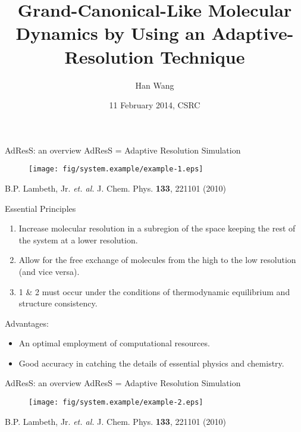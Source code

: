\documentclass[]{beamer}
\newcommand{\redc}[1]{{\color{red} #1}}
\newcommand{\bluec}[1]{{\color{blue} #1}}
\newcommand{\whitec}[1]{{\color{white} #1}}
\begin{document}
\title[Grand-Canonical MD by AdResS]{
  Grand-Canonical-Like Molecular Dynamics  by Using an
  Adaptive-Resolution Technique
}
%
\author{Han Wang}
\date[Feb. 2014]{11 February 2014, CSRC}
\frame{\titlepage}

\begin{frame}{AdResS: an overview}
  \redc{AdResS} = \redc{Ad}aptive \redc{Res}olution \redc{S}imulation
  \begin{figure}
    \centering 
    \texttt{[image: fig/system.example/example-1.eps]}
  \end{figure}
  \footnotesize{B.P. Lambeth, Jr. \textit{et. al.} J. Chem. Phys. \textbf{133}, 221101 (2010)}
\end{frame}

\begin{frame}{Essential Principles}
  \vfill  
  \begin{enumerate}
  \item  \redc{Increase molecular resolution} in a subregion of the space
    keeping the rest of the system at a lower resolution.
  \item  Allow for the \redc{free exchange} of molecules from the
    high to the low resolution (and vice versa).
  \item  1 \& 2 \redc{must} occur under the conditions of {thermodynamic
      equilibrium} and structure consistency.
  \end{enumerate}
  \vfill
  \bluec{Advantages}:
  \begin{itemize}
  \item An optimal employment of \redc{computational resources}.
  \item Good \redc{accuracy} in catching the details of essential physics and
    chemistry.
  \end{itemize}
  \vfill
\end{frame}

\begin{frame}{AdResS: an overview}
  \redc{AdResS} = \redc{Ad}aptive \redc{Res}olution \redc{S}imulation
  \begin{figure}
    \centering 
    \texttt{[image: fig/system.example/example-2.eps]}
  \end{figure}  
  \footnotesize{\whitec{B.P. Lambeth, Jr. \textit{et. al.} J. Chem. Phys. \textbf{133}, 221101 (2010)}}
\end{frame}
\end{document}
